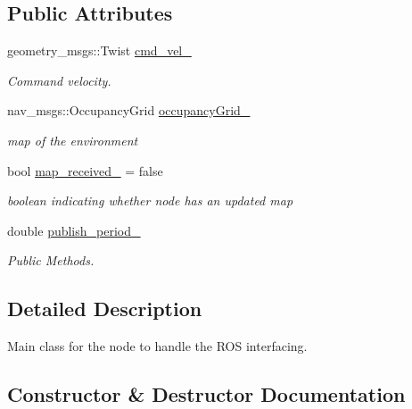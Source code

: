 \subsection*{Public Attributes}
\begin{DoxyCompactItemize}
\item 
geometry\+\_\+msgs\+::\+Twist \hyperlink{classtemplate__node_1_1TemplateNode_ae7b69f24d3ad1c71db7b28d29e446f18}{cmd\+\_\+vel\+\_\+}
\begin{DoxyCompactList}\small\item\em Command velocity. \end{DoxyCompactList}\item 
nav\+\_\+msgs\+::\+Occupancy\+Grid \hyperlink{classtemplate__node_1_1TemplateNode_a757ce09640ae3a1b6bb56e048c940b85}{occupancy\+Grid\+\_\+}
\begin{DoxyCompactList}\small\item\em map of the environment \end{DoxyCompactList}\item 
bool \hyperlink{classtemplate__node_1_1TemplateNode_a2cfed3d8b82b7f1dfb6340a6537afda9}{map\+\_\+received\+\_\+} = false
\begin{DoxyCompactList}\small\item\em boolean indicating whether node has an updated map \end{DoxyCompactList}\item 
double \hyperlink{classtemplate__node_1_1TemplateNode_af85ea62ec4c12e552c4a0c9db66fe28a}{publish\+\_\+period\+\_\+}
\begin{DoxyCompactList}\small\item\em Public Methods. \end{DoxyCompactList}\end{DoxyCompactItemize}


\subsection{Detailed Description}
Main class for the node to handle the R\+OS interfacing. 

\subsection{Constructor \& Destructor Documentation}
